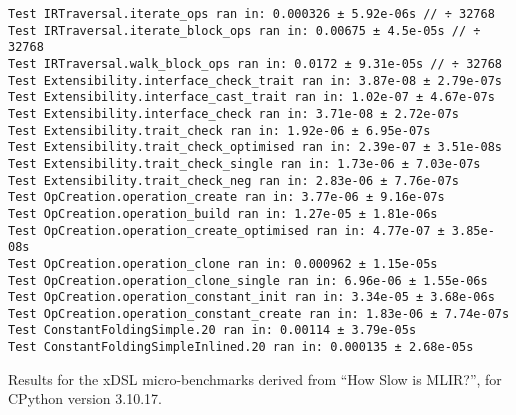 \begin{code}
    \begin{verbatim}
Test IRTraversal.iterate_ops ran in: 0.000326 ± 5.92e-06s // ÷ 32768
Test IRTraversal.iterate_block_ops ran in: 0.00675 ± 4.5e-05s // ÷ 32768
Test IRTraversal.walk_block_ops ran in: 0.0172 ± 9.31e-05s // ÷ 32768
Test Extensibility.interface_check_trait ran in: 3.87e-08 ± 2.79e-07s
Test Extensibility.interface_cast_trait ran in: 1.02e-07 ± 4.67e-07s
Test Extensibility.interface_check ran in: 3.71e-08 ± 2.72e-07s
Test Extensibility.trait_check ran in: 1.92e-06 ± 6.95e-07s
Test Extensibility.trait_check_optimised ran in: 2.39e-07 ± 3.51e-08s
Test Extensibility.trait_check_single ran in: 1.73e-06 ± 7.03e-07s
Test Extensibility.trait_check_neg ran in: 2.83e-06 ± 7.76e-07s
Test OpCreation.operation_create ran in: 3.77e-06 ± 9.16e-07s
Test OpCreation.operation_build ran in: 1.27e-05 ± 1.81e-06s
Test OpCreation.operation_create_optimised ran in: 4.77e-07 ± 3.85e-08s
Test OpCreation.operation_clone ran in: 0.000962 ± 1.15e-05s
Test OpCreation.operation_clone_single ran in: 6.96e-06 ± 1.55e-06s
Test OpCreation.operation_constant_init ran in: 3.34e-05 ± 3.68e-06s
Test OpCreation.operation_constant_create ran in: 1.83e-06 ± 7.74e-07s
Test ConstantFoldingSimple.20 ran in: 0.00114 ± 3.79e-05s
Test ConstantFoldingSimpleInlined.20 ran in: 0.000135 ± 2.68e-05s
    \end{verbatim}
    \caption{Results for the xDSL micro-benchmarks derived from ``How Slow is MLIR?'', for CPython version 3.10.17.}
    \label{listing:how-slow-is-mlir-xdsl-microbenchmark-results-310}
\end{code}
%
